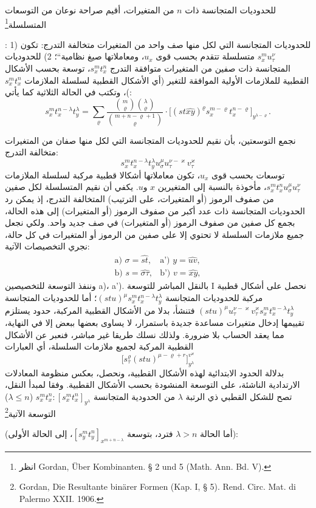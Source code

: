 \documentclass[11pt]{article}
\providecommand{\glqq}{\textquotedblbase}
\providecommand{\grqq}{\textquotedblleft}
\newcommand{\srcLTR}[1]{\relax\ifmmode\text{\mbox{\babelsublr{\foreignlanguage{english}{#1}}}}\else\babelsublr{\foreignlanguage{english}{#1}}\fi}
\newcommand{\srcfn}[2]{\begingroup\renewcommand{\thefootnote}{\srcLTR{#1}}\footnote{#2}\addtocounter{footnote}{-1}\endgroup}
\begin{document}
للحدوديات المتجانسة ذات $n$ من المتغيرات، أقيم صراحة نوعان من التوسعات المتسلسلة\srcfn{**)}{انظر Gordan, Über Kombinanten. § 2 und 5 (Math. Ann. Bd. V).}:
1) للحدوديات المتجانسة التي لكل منها صف واحد من المتغيرات متخالفة التدرج: تكون $s_x^m u_\tau^\nu$ متسلسلة تتقدم بحسب قوى $u_x$، ومعاملاتها \glqq{}صيغ نظامية\grqq{}؛
2) للحدوديات المتجانسة ذات صفين من المتغيرات متوافقة التدرج $s_x^m t_x^n$، توسعة بحسب الأشكال القطبية للملازمات الأولية الموافقة للتغير (أي الأشكال القطبية لسلسلة الملازمات $s_x^m t_x^n$)، وتكتب في الحالة الثلاثية كما يأتي:
\[
\tag{I}
s_x^m t_x^{n-\lambda}t_y^\lambda
=\sum_{\varrho}
\frac{\binom{m}{\varrho}\binom{\lambda}{\varrho}}
 {\binom{m+n-\varrho+1}{\varrho}}\cdot
\bigl[(st\widehat{xy})^\varrho s_x^{m-\varrho}t_x^{n-\varrho}\bigr]_{y^{\lambda-\varrho}}.
\]

نجمع التوسعتين، بأن نقيم للحدوديات المتجانسة التي لكل منها صفان من المتغيرات متخالفة التدرج:
\[
s_x^m t_x^{n-\lambda}t_y^\lambda u_\sigma^\mu u_\tau^{\nu-\varkappa}v_\tau^\varkappa
\]
توسعات بحسب قوى $u_x$، تكون معاملاتها أشكالا قطبية مركبة لسلسلة الملازمات $s_x^m t_x^n u_\sigma^\mu u_\tau^\nu$، مأخوذة بالنسبة إلى المتغيرين $x$ و$u$.
يكفي أن نقيم المتسلسلة لكل صفين من صفوف الرموز (أو المتغيرات، على الترتيب) المتخالفة التدرج، إذ يمكن رد الحدوديات المتجانسة ذات عدد أكبر من صفوف الرموز (أو المتغيرات) إلى هذه الحالة، بجمع كل صفين من صفوف الرموز (أو المتغيرات) في صف جديد واحد.
ولكي نجعل جميع ملازمات السلسلة لا تحتوي إلا على صفين من الرموز أو المتغيرات في كل حالة، نجري التخصيصات الآتية:
\[
\begin{array}{ll}
\text{a) } \sigma=\widehat{st}, & \text{a') } y=\widehat{uv},\\[0.3em]
\text{b) } s=\widehat{\sigma\tau}, & \text{b') } v=\widehat{xy},
\end{array}
\]
وننفذ التوسعة للتخصيصين a)، a').
بالنقل المباشر للتوسعة I نحصل على أشكال قطبية مركبة للحدوديات المتجانسة $(stu)^\mu s_x^m t_x^{n-\lambda}t_y^\lambda$؛ أما للحدوديات المتجانسة $(stu)^\mu u_\tau^{\nu-\varkappa}v_\tau^\varkappa s_x^m t_x^{n-\lambda}t_y^\lambda$ فتنشأ، بدلا من الأشكال القطبية المركبة، حدود يستلزم تقييمها إدخال متغيرات مساعدة جديدة باستمرار، لا يساوى بعضها ببعض إلا في النهاية، مما يعقد الحساب بلا ضرورة.
ولذلك نسلك طريقا غير مباشر، فنعبر عن الأشكال القطبية المركبة لجميع ملازمات السلسلة، أي العبارات
\[
\bigl[s_\tau^\varrho(stu)^{\mu-\varrho+r}\bigr]_{y^\lambda}^{v^\varkappa}
\]
بدلالة الحدود الابتدائية لهذه الأشكال القطبية، ونحصل، بعكس منظومة المعادلات الارتدادية الناشئة، على التوسعة المنشودة بحسب الأشكال القطبية.
وفقا لمبدأ النقل، تصح للشكل القطبي ذي الرتبة $\lambda$ من الحدودية المتجانسة $s_x^m t_x^n:[s_x^m t_x^n]_{y^\lambda}$ ($\lambda\le n$) التوسعة الآتية\srcfn{*)}{Gordan, Die Resultante binärer Formen (Kap. I, § 5). Rend. Circ. Mat. di Palermo XXII. 1906.} (أما الحالة $\lambda>n$ فترد، بتوسعة $[s_y^m t_y^n]_{x^{m+n-\lambda}}$، إلى الحالة الأولى):
\end{document}
